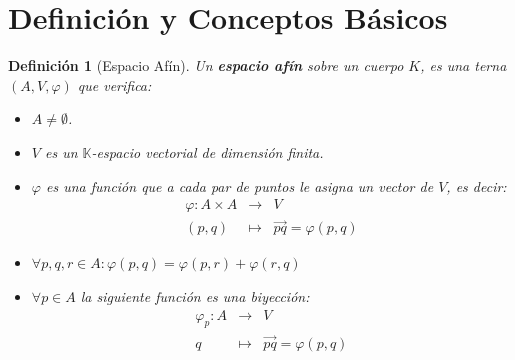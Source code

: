 \documentclass[10pt,a4paper,openright]{book}
\theoremstyle{break}
\newtheorem*{defi}{Definición}
\begin{document}
\section{Definición y Conceptos Básicos}
\begin{defi}[Espacio Afín]
Un \textbf{espacio afín} sobre un cuerpo $K$, es una terna $(A,V,\varphi)$ que verifica:
\begin{itemize}
\item $A \neq \emptyset$.

\item $V$ es un $\mathbb{K}$-espacio vectorial de dimensión finita.

\item $\varphi$ es una función que a cada par de puntos le asigna un vector de $V$, es decir:
\begin{eqnarray*}
\varphi : A\times A &\longrightarrow& V \\ (p,q) &\longmapsto& \vec{pq} = \varphi(p,q)
\end{eqnarray*}

\item $\forall p,q,r \in A: \varphi (p,q) = \varphi(p,r) + \varphi (r,q)$

\item $\forall p \in A$ la siguiente función es una biyección:
\begin{eqnarray*}
\varphi_p : A &\longrightarrow& V \\ q &\longmapsto& \vec{pq} = \varphi(p,q)
\end{eqnarray*}
\end{itemize}
\end{defi}
\end{document}
